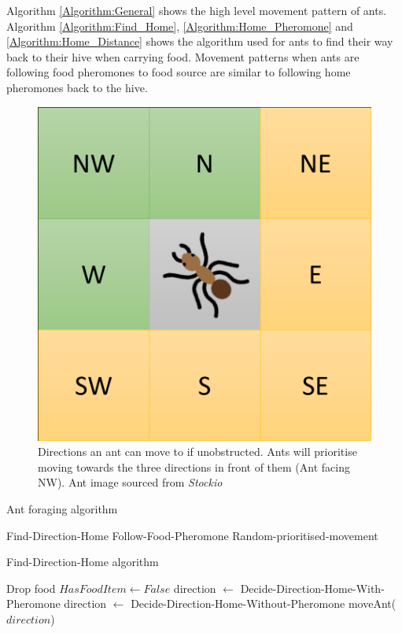 \documentclass[a4paper, oneside, 11pt]{report}
\begin{document}
Algorithm \ref{Algorithm:General} shows the high level movement pattern of ants. Algorithm \ref{Algorithm:Find_Home}, \ref{Algorithm:Home_Pheromone} and \ref{Algorithm:Home_Distance} shows the algorithm used for ants to find their way back to their hive when carrying food. Movement patterns when ants are following food pheromones to food source are similar to following home pheromones back to the hive.

\begin{figure}[htb]
	\begin{center}
	\includegraphics[width=0.35 \columnwidth]{Ant_direction.png}
	\caption{Directions an ant can move to if unobstructed. Ants will prioritise moving towards the three directions in front of them (Ant facing NW). Ant image sourced from \textit{Stockio}}
	\label{fig:Ant_Direction}
	\end{center}
\end{figure}

\begin{algorithm}[th]
\caption{ Ant foraging algorithm } \label{Algorithm:General}
\begin{algorithmic}[1] 
		\State Find-Direction-Home
		\State Follow-Food-Pheromone
	\Else
		\State Random-prioritised-movement
	\EndIf
\end{algorithmic}
\end{algorithm}

\begin{algorithm}[th]
	\caption{ Find-Direction-Home algorithm}  \label{Algorithm:Find_Home}
	\begin{algorithmic}[1]
			\State Drop food 
			\State $HasFoodItem \gets False$
		\Else
			\State direction $\leftarrow$ Decide-Direction-Home-With-Pheromone
				\State direction $\leftarrow$ Decide-Direction-Home-Without-Pheromone
			\EndIf
		\EndIf
		\State moveAnt($direction$)
	\end{algorithmic}
\end{algorithm}
\end{document}
